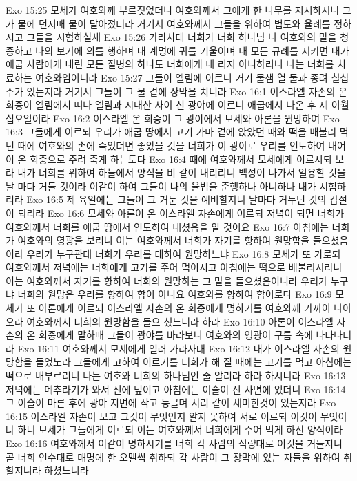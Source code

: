 Exo 15:25  모세가 여호와께 부르짖었더니 여호와께서 그에게 한 나무를 지시하시니 그가 물에 던지매 물이 달아졌더라 거기서 여호와께서 그들을 위하여 법도와 율례를 정하시고 그들을 시험하실새
Exo 15:26  가라사대 너희가 너희 하나님 나 여호와의 말을 청종하고 나의 보기에 의를 행하며 내 계명에 귀를 기울이며 내 모든 규례를 지키면 내가 애굽 사람에게 내린 모든 질병의 하나도 너희에게 내 리지 아니하리니 나는 너희를 치료하는 여호와임이니라
Exo 15:27  그들이 엘림에 이르니 거기 물샘 열 둘과 종려 칠십주가 있는지라 거기서 그들이 그 물 곁에 장막을 치니라
Exo 16:1  이스라엘 자손의 온 회중이 엘림에서 떠나 엘림과 시내산 사이 신 광야에 이르니 애굽에서 나온 후 제 이월 십오일이라
Exo 16:2  이스라엘 온 회중이 그 광야에서 모세와 아론을 원망하여
Exo 16:3  그들에게 이르되 우리가 애굽 땅에서 고기 가마 곁에 앉았던 때와 떡을 배불리 먹던 때에 여호와의 손에 죽었더면 좋았을 것을 너희가 이 광야로 우리를 인도하여 내어 이 온 회중으로 주려 죽게 하는도다
Exo 16:4  때에 여호와께서 모세에게 이르시되 보라 내가 너희를 위하여 하늘에서 양식을 비 같이 내리리니 백성이 나가서 일용할 것을 날 마다 거둘 것이라 이같이 하여 그들이 나의 율법을 준행하나 아니하나 내가 시험하리라
Exo 16:5  제 육일에는 그들이 그 거둔 것을 예비할지니 날마다 거두던 것의 갑절이 되리라
Exo 16:6  모세와 아론이 온 이스라엘 자손에게 이르되 저녁이 되면 너희가 여호와께서 너희를 애굽 땅에서 인도하여 내셨음을 알 것이요
Exo 16:7  아침에는 너희가 여호와의 영광을 보리니 이는 여호와께서 너희가 자기를 향하여 원망함을 들으셨음이라 우리가 누구관대 너희가 우리를 대하여 원망하느냐
Exo 16:8  모세가 또 가로되 여호와께서 저녁에는 너희에게 고기를 주어 먹이시고 아침에는 떡으로 배불리시리니 이는 여호와께서 자기를 향하여 너희의 원망하는 그 말을 들으셨음이니라 우리가 누구냐 너희의 원망은 우리를 향하여 함이 아니요 여호와를 향하여 함이로다
Exo 16:9  모세가 또 아론에게 이르되 이스라엘 자손의 온 회중에게 명하기를 여호와께 가까이 나아오라 여호와께서 너희의 원망함을 들으 셨느니라 하라
Exo 16:10  아론이 이스라엘 자손의 온 회중에게 말하매 그들이 광야를 바라보니 여호와의 영광이 구름 속에 나타나더라
Exo 16:11  여호와께서 모세에게 일러 가라사대
Exo 16:12  내가 이스라엘 자손의 원망함을 들었노라 그들에게 고하여 이르기를 너희가 해 질 때에는 고기를 먹고 아침에는 떡으로 배부르리니 나는 여호와 너희의 하나님인 줄 알리라 하라 하시니라
Exo 16:13  저녁에는 메추라기가 와서 진에 덮이고 아침에는 이슬이 진 사면에 있더니
Exo 16:14  그 이슬이 마른 후에 광야 지면에 작고 둥글며 서리 같이 세미한것이 있는지라
Exo 16:15  이스라엘 자손이 보고 그것이 무엇인지 알지 못하여 서로 이르되 이것이 무엇이냐 하니 모세가 그들에게 이르되 이는 여호와께서 너희에게 주어 먹게 하신 양식이라
Exo 16:16  여호와께서 이같이 명하시기를 너희 각 사람의 식량대로 이것을 거둘지니 곧 너희 인수대로 매명에 한 오멜씩 취하되 각 사람이 그 장막에 있는 자들을 위하여 취할지니라 하셨느니라
